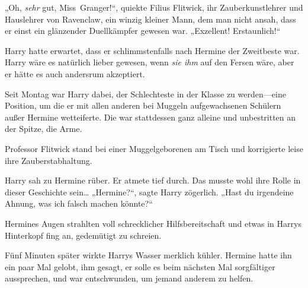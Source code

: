 „Oh, \emph{sehr} gut, Miss~Granger!“, quiekte Filius Flitwick, ihr Zauberkunstlehrer und Hauslehrer von Ravenclaw, ein winzig kleiner Mann, dem man nicht ansah, dass er einst ein glänzender Duellkämpfer gewesen war. „Exzellent! Erstaunlich!“

Harry hatte erwartet, dass er schlimmstenfalls nach Hermine der Zweitbeste war. Harry wäre es natürlich lieber gewesen, wenn \emph{sie ihm} auf den Fersen wäre, aber er hätte es auch andersrum akzeptiert.

Seit Montag war Harry dabei, der Schlechteste in der Klasse zu werden—eine Position, um die er mit allen anderen bei Muggeln aufgewachsenen Schülern außer Hermine wetteiferte. Die war stattdessen ganz alleine und unbestritten an der Spitze, die Arme.

Professor Flitwick stand bei einer Muggelgeborenen am Tisch und korrigierte leise ihre Zauberstabhaltung.

Harry sah zu Hermine rüber. Er atmete tief durch. Das musste wohl ihre Rolle in dieser Geschichte sein… „Hermine?“, sagte Harry zögerlich. „Hast du irgendeine Ahnung, was ich falsch machen könnte?“

Hermines Augen strahlten voll schrecklicher Hilfsbereitschaft und etwas in Harrys Hinterkopf fing an, gedemütigt zu schreien.

Fünf Minuten später wirkte Harrys Wasser merklich kühler. Hermine hatte ihn ein paar Mal gelobt, ihm gesagt, er solle es beim nächsten Mal sorgfältiger aussprechen, und war entschwunden, um jemand anderem zu helfen.

